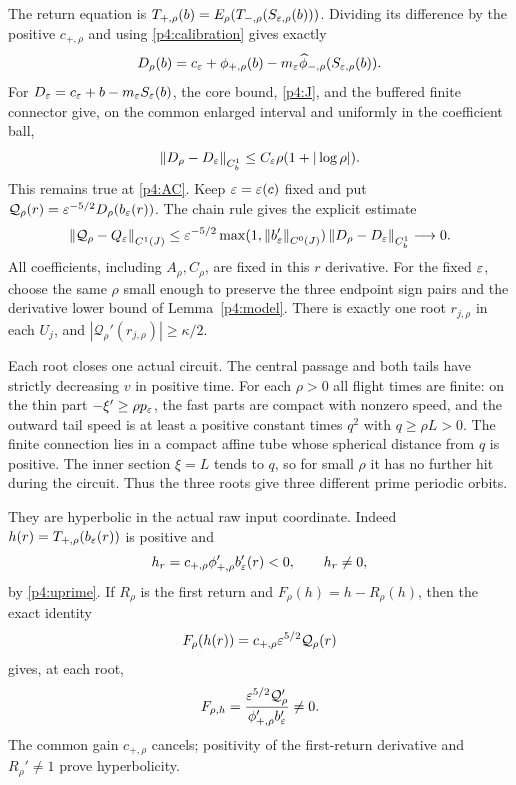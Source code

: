 The return equation is
$T_{+,\rho}(b)=E_\rho(T_{-,\rho}(S_{\varepsilon,\rho}(b)))$.
Dividing its difference by the positive $c_{+,\rho}$ and using
\eqref{p4:calibration} gives exactly
\begin{equation}\label{p4:actual-displacement}
 D_\rho(b)=c_\varepsilon+\phi_{+,\rho}(b)
         -m_\varepsilon\widehat\phi_{-,\rho}(S_{\varepsilon,\rho}(b)).
\end{equation}
For $D_\varepsilon=c_\varepsilon+b-m_\varepsilon S_\varepsilon(b)$, the core bound,
\eqref{p4:J}, and the buffered finite connector give, on the common
enlarged interval and uniformly in the coefficient ball,
\begin{equation}\label{p4:normalized-error}
 \left\lVert D_\rho-D_\varepsilon\right\rVert_{C^1_b}
       \le C_\varepsilon\rho(1+|\log\rho|).
\end{equation}
This remains true at \eqref{p4:AC}. Keep $\varepsilon=\varepsilon(c)$ fixed and put
$\mathcal Q_\rho(r)=\varepsilon^{-5/2}D_\rho(b_\varepsilon(r))$.
The chain rule gives the explicit estimate
\begin{equation}\label{p4:actual-error}
 \left\lVert \mathcal Q_\rho-Q_\varepsilon\right\rVert_{C^1(J)}
 \le \varepsilon^{-5/2}\max(1,\left\lVert b_\varepsilon'\right\rVert_{C^0(J)})
                         \left\lVert D_\rho-D_\varepsilon\right\rVert_{C^1_b}
 \longrightarrow0.
\end{equation}
All coefficients, including $A_\rho,C_\rho$, are fixed in this
$r$ derivative. For the fixed $\varepsilon$, choose the same $\rho$
small enough to preserve the three endpoint sign pairs and the
derivative lower bound of Lemma~\ref{p4:model}.
There is exactly one root $r_{j,\rho}$ in each $U_j$, and
$|\mathcal Q_\rho'(r_{j,\rho})|\ge\kappa/2$.

Each root closes one actual circuit. The central passage and both
tails have strictly decreasing $v$ in positive time.
For each $\rho>0$ all flight times are finite: on the thin part
$-\xi'\ge\rho p_\varepsilon$, the fast parts are compact with nonzero
speed, and the outward tail speed is at least a positive constant
times $q^2$ with $q\ge\rho L>0$.
The finite connection lies in a compact affine tube whose spherical
distance from $q$ is positive. The inner section $\xi=L$ tends to
$q$, so for small $\rho$ it has no further hit during the circuit.
Thus the three roots give three different prime periodic orbits.

They are hyperbolic in the actual raw input coordinate.
Indeed $h(r)=T_{+,\rho}(b_\varepsilon(r))$ is positive and
\[
 h_r=c_{+,\rho}\phi_{+,\rho}'b_\varepsilon'(r)<0,\qquad h_r\ne0,
\]
by \eqref{p4:uprime}. If $R_\rho$ is the first return and
$F_\rho(h)=h-R_\rho(h)$, then the exact identity
\[
 F_\rho(h(r))=c_{+,\rho}\varepsilon^{5/2}\mathcal Q_\rho(r)
\]
gives, at each root,
\begin{equation}\label{p4:physical-simple}
 F_{\rho,h}=
 \frac{\varepsilon^{5/2}\mathcal Q_\rho'}
      {\phi_{+,\rho}'b_\varepsilon'}\ne0.
\end{equation}
The common gain $c_{+,\rho}$ cancels; positivity of the first-return
derivative and $R_\rho'\ne1$ prove hyperbolicity.

